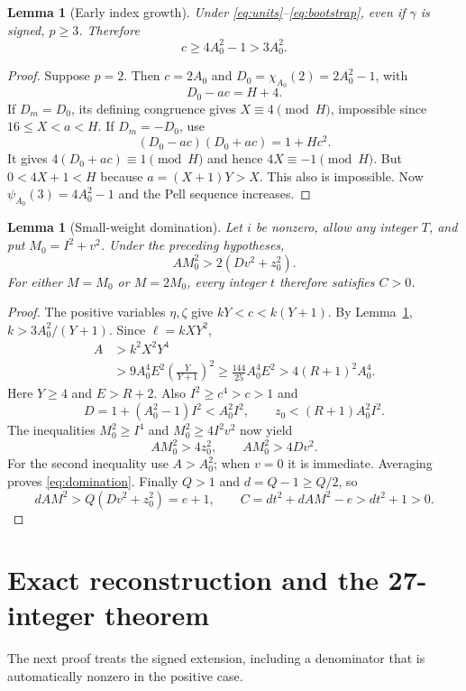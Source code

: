 \documentclass[11pt]{article}
\newtheorem{lemma}[theorem]{Lemma}
\theoremstyle{definition}\newtheorem{definition}[theorem]{Definition}
\theoremstyle{remark}\newtheorem{remark}[theorem]{Remark}
\begin{document}
\begin{lemma}[Early index growth]
\label{lem:early}
Under \eqref{eq:units}--\eqref{eq:bootstrap}, even if $\gamma$ is signed, $p\ge3$. Therefore
\begin{equation}
c\ge4A_0^2-1>3A_0^2.\label{eq:cgrowth}
\end{equation}
\end{lemma}
\begin{proof}
Suppose $p=2$. Then $c=2A_0$ and $D_0=\chi_{A_0}(2)=2A_0^2-1$, with
\[
D_0-ac=H+4.
\]
If $D_m=D_0$, its defining congruence gives $X\equiv4\pmod H$, impossible since $16\le X<a<H$. If $D_m=-D_0$, use
\[
(D_0-ac)(D_0+ac)=1+Hc^2.
\]
It gives $4(D_0+ac)\equiv1\pmod H$ and hence $4X\equiv-1\pmod H$. But $0<4X+1<H$ because $a=(X+1)Y>X$. This also is impossible. Now $\psi_{A_0}(3)=4A_0^2-1$ and the Pell sequence increases.
\end{proof}

\begin{lemma}[Small-weight domination]
\label{lem:domination}
Let $i$ be nonzero, allow any integer $T$, and put $M_0=I^2+v^2$. Under the preceding hypotheses,
\begin{equation}
AM_0^2>2(Dv^2+z_0^2).\label{eq:domination}
\end{equation}
For either $M=M_0$ or $M=2M_0$, every integer $t$ therefore satisfies $C>0$.
\end{lemma}
\begin{proof}
The positive variables $\eta,\zeta$ give $kY<c<k(Y+1)$. By Lemma~\ref{lem:early}, $k>3A_0^2/(Y+1)$. Since $\ell=kXY^2$,
\begin{align*}
A&>k^2X^2Y^4\\
 &>9A_0^4E^2\left(\frac{Y}{Y+1}\right)^2
 \ge\frac{144}{25}A_0^4E^2
 >4(R+1)^2A_0^4.
\end{align*}
Here $Y\ge4$ and $E>R+2$. Also $I^2\ge c^4>c>1$ and
\[
D=1+(A_0^2-1)I^2<A_0^2I^2,
\qquad z_0<(R+1)A_0^2I^2.
\]
The inequalities $M_0^2\ge I^4$ and $M_0^2\ge4I^2v^2$ now yield
\[
AM_0^2>4z_0^2,\qquad AM_0^2>4Dv^2.
\]
For the second inequality use $A>A_0^2$; when $v=0$ it is immediate. Averaging proves \eqref{eq:domination}. Finally $Q>1$ and $d=Q-1\ge Q/2$, so
\[
dAM^2>Q(Dv^2+z_0^2)=e+1,
\qquad C=dt^2+dAM^2-e>dt^2+1>0.
\]
\end{proof}

\section{Exact reconstruction and the 27-integer theorem}
\label{sec:signed}
The next proof treats the signed extension, including a denominator that is automatically nonzero in the positive case.
\end{document}
